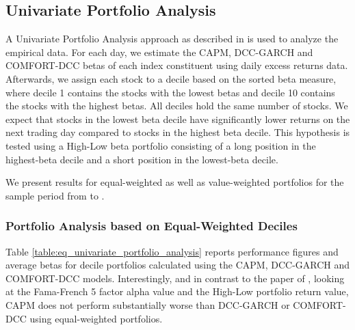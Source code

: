 \documentclass[11pt,a4paper]{article}
\begin{document}
\subsection{Univariate Portfolio Analysis}

A Univariate Portfolio Analysis approach as described in  is used to analyze the empirical data. For each day, we estimate the CAPM, DCC-GARCH and COMFORT-DCC betas of each \indexName{} index constituent using daily excess returns data. Afterwards, we assign each stock to a decile based on the sorted beta measure, where decile 1 contains the stocks with the lowest betas and decile 10 contains the stocks with the highest betas. All deciles hold the same number of stocks. We expect that stocks in the lowest beta decile have significantly lower returns on the next trading day compared to stocks in the highest beta decile. This hypothesis is tested using a High-Low beta portfolio consisting of a long position in the highest-beta decile and a short position in the lowest-beta decile. 

We present results for equal-weighted as well as value-weighted portfolios for the sample period from \periodFrom{} to \periodTo{}.




\subsubsection{Portfolio Analysis based on Equal-Weighted Deciles}

Table \ref{table:eq_univariate_portfolio_analysis} reports performance figures and average betas for decile portfolios calculated using the CAPM, DCC-GARCH and COMFORT-DCC models. Interestingly, and in contrast to the paper of , looking at the Fama-French 5 factor alpha value and the High-Low portfolio return value, CAPM does not perform substantially worse than DCC-GARCH or COMFORT-DCC using equal-weighted portfolios.
\end{document}
